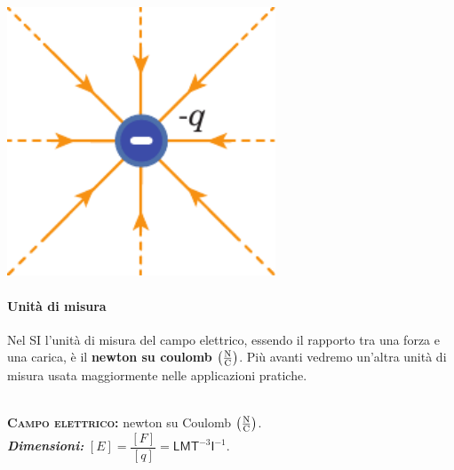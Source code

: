 \begin{define}
\begin{center}
		\begin{minipage}{0.45\textwidth}
			\begin{center}
				\includegraphics[width=0.6\textwidth]{images/chp1/chp1campocoulomb2.pdf}
			\end{center}
		\end{minipage}
	\end{center}
\end{define}
\paragraph{Unità di misura}
Nel SI l'unità di misura del campo elettrico, essendo il rapporto tra una forza e una carica, è il \textbf{newton su coulomb} $\left(\unit[per-mode = fraction]{\newton\per\coulomb}\right)$. Più avanti vedremo un'altra unità di misura usata maggiormente nelle applicazioni pratiche.
\begin{units}~\\
	\textbf{\textsc{Campo elettrico:}} newton su Coulomb $\left(\unit[per-mode = fraction]{\newton\per\coulomb}\right)$.\\
	\textit{\textbf{Dimensioni:}} $[E]=\dfrac{[F]}{[q]}=\mathsf{L}\mathsf{M}\mathsf{T}^{-3}\mathsf{I}^{-1}$.
\end{units}
